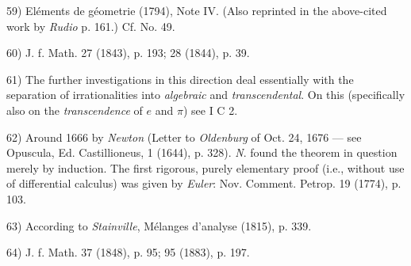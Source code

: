 \vfill
\leftline{\rule{2in}{0.4pt}}
\vspace{0.2cm}
{
\footnotesize
59) Eléments de géometrie (1794), Note IV. (Also reprinted in the above-cited work by \textit{Rudio} p. 161.) Cf. No. 49.

60) J. f. Math. 27 (1843), p. 193; 28 (1844), p. 39.

61) The further investigations in this direction deal essentially with the separation of irrationalities into \textit{algebraic} and \textit{transcendental}. On this (specifically also on the \textit{transcendence} of $e$ and $\pi$) see I C 2.

62) Around 1666 by \textit{Newton} (Letter to \textit{Oldenburg} of Oct. 24, 1676 — see Opuscula, Ed. Castillioneus, 1 (1644), p. 328). \textit{N}. found the theorem in question merely by induction. The first rigorous, purely elementary proof (i.e., without use of differential calculus) was given by \textit{Euler}: Nov. Comment. Petrop. 19 (1774), p. 103.

63) According to \textit{Stainville}, Mélanges d'analyse (1815), p. 339.

64) J. f. Math. 37 (1848), p. 95; 95 (1883), p. 197.

}